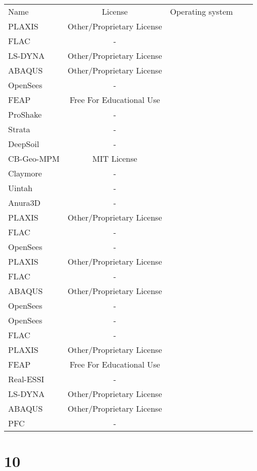 \begin{table}[]
    \centering
    \begin{tabular}{l|cccc}
    \toprule
    Name &  License & Operating system\\
        PLAXIS &  Other/Proprietary License &\\
        FLAC & - &\\
        LS-DYNA &  Other/Proprietary License &\\
        ABAQUS &  Other/Proprietary License &\\
        OpenSees & - &\\
        FEAP &  Free For Educational Use &\\
        ProShake & - &\\
        Strata & - &\\
        DeepSoil & - &\\
        CB-Geo-MPM &  MIT License &\\
        Claymore & - &\\
        Uintah & - &\\
        Anura3D & - &\\
        PLAXIS &  Other/Proprietary License &\\
        FLAC & - &\\
        OpenSees & - &\\
        PLAXIS &  Other/Proprietary License &\\
        FLAC & - &\\
        ABAQUS &  Other/Proprietary License &\\
        OpenSees & - &\\
        OpenSees & - &\\
        FLAC & - &\\
        PLAXIS &  Other/Proprietary License &\\
        FEAP &  Free For Educational Use &\\
        Real-ESSI & - &\\
        LS-DYNA &  Other/Proprietary License &\\
        ABAQUS &  Other/Proprietary License &\\
        PFC & - &\\

    \bottomrule
    \end{tabular}
    \end{table}

\section{10}

